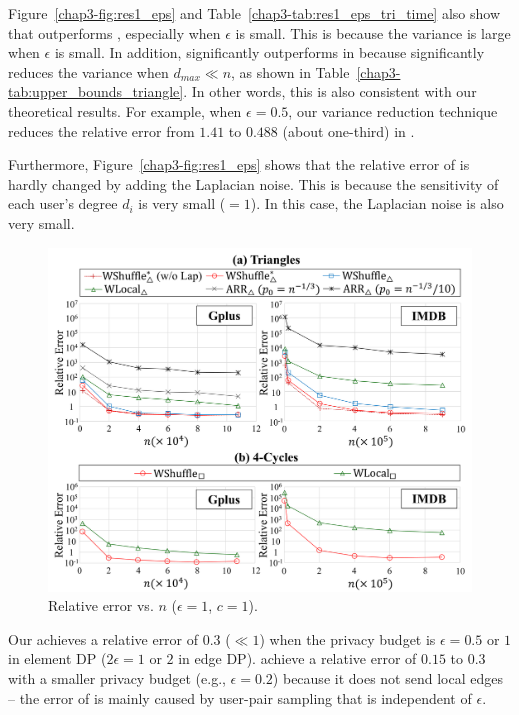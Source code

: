 Figure~\ref{chap3-fig:res1_eps} and Table~\ref{chap3-tab:res1_eps_tri_time} also show that \AlgWSTriVR{} outperforms \AlgWSTri{}, especially when $\epsilon$ is small. 
This is because the variance is large when $\epsilon$ is small. 
In addition, \AlgWSTriVR{} significantly outperforms \AlgWSTri{} in \IMDB{} because \AlgWSTriVR{} significantly reduces the variance when $d_{max} \ll n$, as shown in Table~\ref{chap3-tab:upper_bounds_triangle}. 
In other words, this is also consistent with our theoretical results. 
For example, when $\epsilon=0.5$, our variance reduction technique reduces the relative error from $1.41$ to $0.488$ (about one-third) in \IMDB{}. 

Furthermore, Figure~\ref{chap3-fig:res1_eps} shows that the relative error of \AlgWSTriVR{} is hardly changed by adding the Laplacian noise. 
This is because the sensitivity of each user's degree $d_i$ is very small ($=1$). 
In this case, the Laplacian noise is also very small. 

\begin{figure}[t]
  \centering
  \includegraphics[width=0.99\linewidth]{fig/res2_n.pdf}
  
  \caption{Relative error vs. $n$ ($\epsilon=1$, $c=1$).
  }
  \label{chap3-fig:res2_n}
\end{figure}

Our \AlgWSTriVR{} achieves a relative error of $0.3$ ($\ll 1$) 
when the privacy budget is $\epsilon = 0.5$ or $1$ in element DP ($2\epsilon = 1$ or $2$ in edge DP). 
\AlgWSCyc{} achieve a relative error of $0.15$ to $0.3$ with a smaller privacy budget (e.g., $\epsilon = 0.2$) because it  does not send local edges -- the error of \AlgWSCyc{} is mainly caused by user-pair sampling that is independent of $\epsilon$. 

